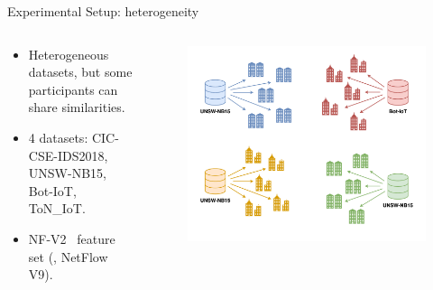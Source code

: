 \begin{frame}{Experimental Setup: heterogeneity}
  \begin{columns}
    \begin{column}{.6\textwidth}
      \begin{itemize}
        \item Heterogeneous datasets, but some participants can share similarities.
        \item 4 datasets: CIC-CSE-IDS2018, UNSW-NB15, Bot-IoT, ToN\_IoT.
        \item NF-V2~\autocite{sarhan_StandardFeatureSet_2021} feature set (\ie, NetFlow V9).
      \end{itemize}
    \end{column}
    \begin{column}{.5\textwidth}
      \begin{figure}

        \includegraphics[width=\linewidth]{figures/eval/setup/partition.pdf}%

      \end{figure}
    \end{column}
  \end{columns}
\end{frame}


